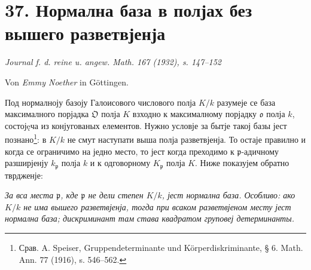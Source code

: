 \documentclass[11pt]{article}
\providecommand{\frakO}{\mathfrak{O}}
\providecommand{\frako}{\mathfrak{o}}
\providecommand{\frakp}{\mathfrak{p}}
\begin{document}
\section*{37. Нормална база в полјах без вышего разветвјенја}

\begin{center}
\emph{Journal f. d. reine u. angew. Math. 167 (1932), s. 147--152}
\end{center}

\begin{center}
Von \emph{Emmy Noether} in Göttingen.
\end{center}

Под нормалноју базоју Галоисового числового полја \(K/k\) разумеје се база максималного порјадка \(\frakO\) полја \(K\) взходно к максималному порјадку \(\frako\) полја \(k\), состојęча из конјугованых елементов. Нужно условје за бытје такој базы јест познано\footnote{Срав. A. Speiser, Gruppendeterminante und Körperdiskriminante, § 6. Math. Ann. 77 (1916), s. 546--562.}: в \(K/k\) не смут наступати выша полја разветвјенја. То остаје правилно и когда се ограничимо на једно место, то јест когда преходимо к \(\frakp\)-адичному разширјенју \(k_\frakp\) полја \(k\) и к одговорному \(K_\frakp\) полја \(K\). Ниже показујем обратно тврдженје:

\emph{За вса места \(\frakp\), кде \(\frakp\) не дели степен \(K/k\), јест нормална база. Особливо: ако \(K/k\) не има вышего разветвјенја, тогда при всаком разветвјеном месту јест нормална база; дискриминант там става квадратом груповеј детерминанты.}
\end{document}
